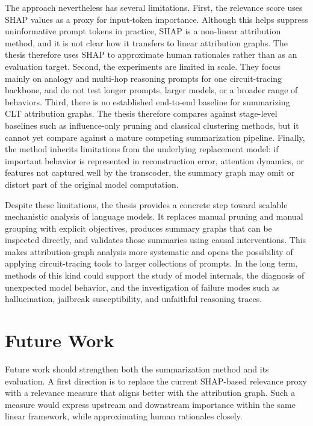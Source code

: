\documentclass[../main.tex]{subfiles}
\begin{document}
The approach nevertheless has several limitations. First, the relevance score uses
SHAP values as a proxy for input-token importance. Although this helps suppress
uninformative prompt tokens in practice, SHAP is a non-linear attribution method, and it is
not clear how it transfers to linear attribution graphs. The thesis therefore uses SHAP to
approximate human rationales rather than as an evaluation target. Second, the experiments are
limited in scale. They focus mainly on analogy and multi-hop reasoning prompts
for one circuit-tracing backbone, and do not test longer prompts, larger models, or
a broader range of behaviors. Third, there is no
established end-to-end baseline for summarizing CLT attribution graphs. The thesis
therefore compares against stage-level baselines such as influence-only pruning and
classical clustering methods, but it cannot yet compare against a mature competing
summarization pipeline. Finally, the method inherits limitations from the underlying
replacement model: if important behavior is represented in reconstruction error,
attention dynamics, or features not captured well by the transcoder, the summary
graph may omit or distort part of the original model computation.

Despite these limitations, the thesis provides a concrete step toward scalable
mechanistic analysis of language models. It replaces manual pruning and manual
grouping with explicit objectives, produces summary graphs that can be inspected
directly, and validates those summaries using causal interventions. This makes
attribution-graph analysis more systematic and opens the possibility of applying
circuit-tracing tools to larger collections of prompts. In the long term, methods of
this kind could support the study of model internals, the diagnosis of unexpected
model behavior, and the investigation of failure modes such as hallucination,
jailbreak susceptibility, and unfaithful reasoning traces.

\section{Future Work}

Future work should strengthen both the summarization method and its evaluation.
A first direction is to replace the current SHAP-based relevance proxy with a
relevance measure that aligns better with the attribution graph. Such a measure would
express upstream and downstream importance within the same linear framework, while
approximating human rationales closely.
\end{document}
